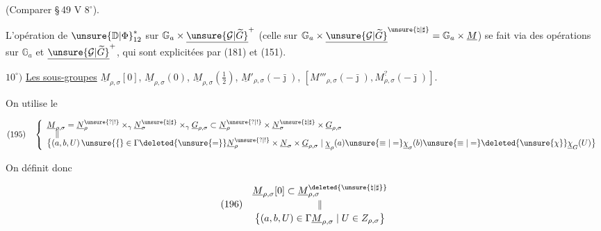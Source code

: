 (Comparer \S\,49 $\mathrm V$ $8^{\circ}$).

L'opération de $\unsure{\mathbb D|\Phi}_{12}^{*}$ sur
$\mathbb G_a\times\underline{\unsure{\mathcal G|\widetilde G}}^{+}$
(celle sur $\mathbb G_a\times\underline{\unsure{\mathcal G|\widetilde G}}^{\unsure{\natural|\sharp}}
=\mathbb G_a\times\underline M$) se fait via des opérations sur
$\mathbb G_a$ et $\underline{\unsure{\mathcal G|\widetilde G}}^{+}$, qui sont explicitées
 par (181) et (151).



$10^{\circ})$ \uline{Les sous-groupes}
$\underline M_{\rho,\sigma}[0]$, $\underline M_{\rho,\sigma}(0)$,
$\underline M_{\rho,\sigma}(\frac12)$,
$\underline M'_{\rho,\sigma}(-\bar\jmath)$,
$[M'''_{\rho,\sigma}(-\bar\jmath),M^{?}_{\rho,\sigma}(-\bar\jmath)]$.

On utilise le 

\[
(195)\quad
\left\{\begin{array}{l}
\underline M_{\rho,\sigma}
=\underline N_\rho^{\unsure{?|!}}\times_\gamma
 \underline N_\sigma^{\unsure{\natural|\sharp}}\times_\gamma
 \underline G_{\rho,\sigma}
\subset\underline N_\rho^{\unsure{?|!}}\times
 \underline N_\sigma^{\unsure{\natural|\sharp}}\times
 \underline G_{\rho,\sigma}
\\[-2pt]
\quad\Vert
\\[-2pt]
\bigl\{(a,b,U)\,\unsure{\{}\in
 \Gamma\deleted{\unsure{=}}\underline N_\rho^{\unsure{?|!}}
 \times\underline N_\sigma\times\underline G_{\rho,\sigma}
 \mid\underline\chi_\rho(a)\unsure{\equiv|=}
 \underline\chi_\sigma(b)\unsure{\equiv|=}
 \deleted{\unsure{\chi}}\underline\chi_G(U)\bigr\}
\end{array}\right.
\]

On définit donc

\[
(196)\quad\begin{gathered}
\underline M_{\rho,\sigma}[0]\subset
\underline M_{\rho,\sigma}^{\deleted{\unsure{\natural|\sharp}}}
\\[-2pt]
\Vert
\\[-2pt]
\bigl\{(a,b,U)\in\Gamma\underline M_{\rho,\sigma}
 \mid U\in Z_{\rho,\sigma}\bigr\}
\end{gathered}
\]


